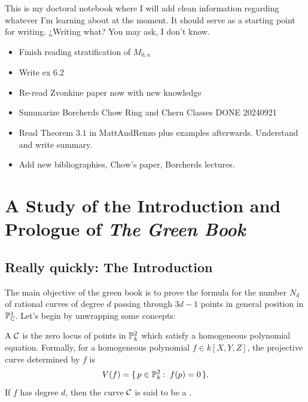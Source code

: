 \documentclass[12pt]{memoir}
\author{\nauthor}
\begin{document}
{\small 
\setlength{\parindent}{0em}
\setlength{\parskip}{1em}

This is my doctoral notebook where I will add clean information regarding whatever I'm learning about at the moment. It should serve as a starting point for writing. ¿Writing what? You may ask, I don't know.

\begin{itemize}
    \item Finish reading stratification of $M_{0,n}$
    \item Write ex 6.2
    \item Re-read Zvonkine paper now with new knowledge
    \item Summarize Borcherds Chow Ring and Chern Classes DONE 20240921
\end{itemize}
\begin{itemize}
    \item Read Theorem 3.1 in MattAndRenzo plus examples afterwards. Understand and write summary.
    \item Add new bibliographies, Chow's paper, Borcherds lectures.
\end{itemize}
}
\newpage
\tableofcontents
\chapter{A Study of the Introduction and Prologue of \emph{The Green Book}}

\section{Really quickly: The Introduction}

The main objective of the green book is to prove the formula for the number $N_d$ of rational curves of degree $d$ passing through $3d-1$ points in general position in $\mathbb{P}_{\mathbb{C}}^1$. Let's begin by unwrapping some concepts:

\begin{Def}
A  $\mathcal{C}$ is the zero locus of points in $\mathbb{P}^2_k$ which satisfy a homogeneous polynomial equation. Formally, for a homogeneous polynomial $f\in k[X,Y,Z]$, the projective curve determined by $f$ is
$$V(f)=\set{p\in\bP^2_k\:\ f(p)=0}.$$
If $f$ has degree $d$, then the curve $\mathcal{C}$ is said to be a .
\end{Def}
\end{document}
